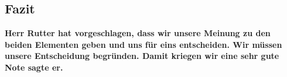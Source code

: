 
\subsection{Fazit}


\textbf{Herr Rutter hat vorgeschlagen, dass wir unsere Meinung zu den beiden Elementen geben und uns für 
eins entscheiden. Wir müssen unsere Entscheidung begründen. Damit kriegen wir eine sehr gute Note sagte er.}